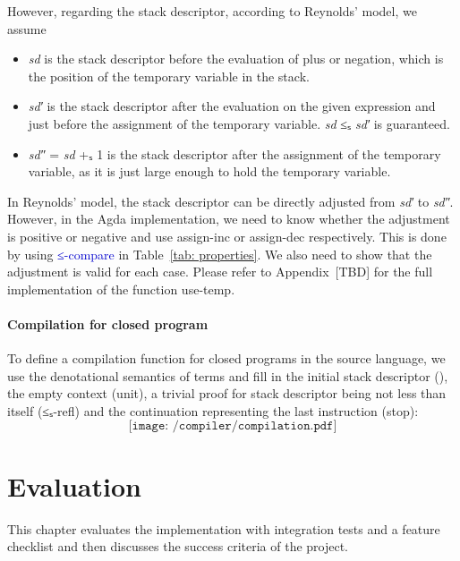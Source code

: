 \documentclass[12pt,a4paper]{report}
\makeatletter
\theoremstyle{definition}
\newcommand{\mb}[1]{\textcolor{mediumblue}{#1}}
\newcommand{\mbt}[1]{\mb{\textsf{#1}}}
\newcommand{\ang}[1]{\left\langle #1 \right\rangle}
\newcommand{\chapterminitoc}{%
  \begingroup
    \let\ps@plain\ps@empty %
    \let\ps@headings\ps@empty
    \minitoc
    \thispagestyle{empty} %
    \afterpage{\clearpage} %
  \endgroup
    \clearpage
  \addtocounter{page}{-1} %
}
\makeatother
\begin{document}
        However, regarding the stack descriptor, according to Reynolds' model, we assume
        \begin{itemize}
            \item \textit{sd} is the stack descriptor before the evaluation of plus or negation, which is the position of the temporary variable in the stack.
            \item \textit{sd′} is the stack descriptor after the evaluation on the given expression and just before the assignment of the temporary variable. \textit{sd} ≤ₛ \textit{sd′} is guaranteed.
            \item \textit{sd″} = \textit{sd} +ₛ 1 is the stack descriptor after the assignment of the temporary variable, as it is just large enough to hold the temporary variable.
        \end{itemize}
        In Reynolds' model, the stack descriptor can be directly adjusted from \textit{sd′} to \textit{sd″}. However, in the Agda implementation, we need to know whether the adjustment is positive or negative and use \textsf{assign-inc} or \textsf{assign-dec} respectively. This is done by using \mbt{≤-compare} in Table~\ref{tab: properties}. We also need to show that the adjustment is valid for each case. Please refer to Appendix~[TBD] for the full implementation of the function \textsf{use-temp}.
        

        \subsubsection{Compilation for closed program} \label{subsubsec: compilation}
        To define a compilation function for closed programs in the source language, we use the denotational semantics of terms and fill in the initial stack descriptor (\text{\ang{0, 0}}), the empty context (\textsf{unit}), a trivial proof for stack descriptor being not less than itself (\textsf{≤ₛ-refl}) and the continuation representing the last instruction (\textsf{stop}):
        \[\texttt{[image: /compiler/compilation.pdf]}\]




\chapter{Evaluation}
    \chapterminitoc
    This chapter evaluates the implementation with integration tests and a feature checklist and then discusses the success criteria of the project.
\end{document}
